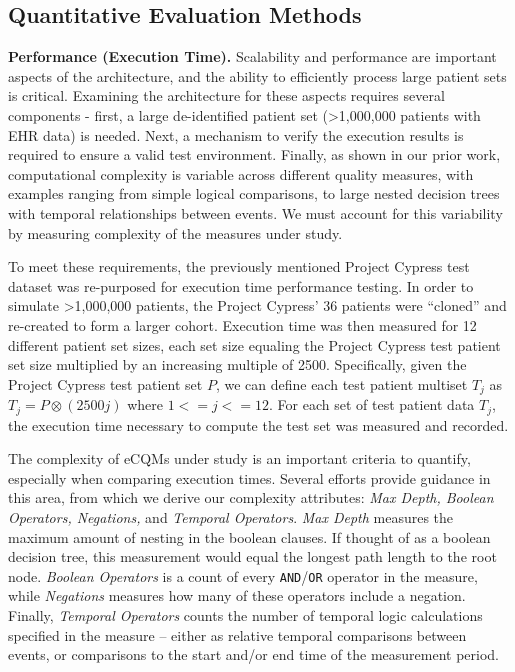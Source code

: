 \documentclass{amia}
\begin{document}
\subsection{Quantitative Evaluation Methods}
\textbf{Performance (Execution Time).}
Scalability and performance are important aspects of the architecture, and the ability to efficiently process large patient sets is critical. Examining the architecture for these aspects requires several components - first, a large de-identified patient set (\textgreater1,000,000 patients with EHR data) is needed. Next, a mechanism to verify the execution results is required to ensure a valid test environment. Finally, as shown in our prior work\cite{thompson2012evaluation}, computational complexity is variable across different quality measures, with examples ranging from simple logical comparisons, to large nested decision trees with temporal relationships between events. We must account for this variability by measuring complexity of the measures under study.

To meet these requirements, the previously mentioned Project Cypress test dataset was re-purposed for execution time performance testing. In order to simulate \textgreater1,000,000 patients, the Project Cypress' 36 patients were ``cloned'' and re-created to form a larger cohort. Execution time was then measured for 12 different patient set sizes, each set size equaling the Project Cypress test patient set size multiplied by an increasing multiple of 2500. Specifically, given the Project Cypress test patient set $P$, we can define each test patient multiset $T_j$ as $T_j = P \otimes (2500j)$ where $1 <= j <= 12$. For each set of test patient data $T_j$, the execution time necessary to compute the test set was measured and recorded.

The complexity of eCQMs under study is an important criteria to quantify, especially when comparing execution times. Several efforts provide guidance in this area\cite{li2012modeling,ross2010analysis}, from which we derive our complexity attributes: \textit{Max Depth,  Boolean Operators, Negations,} and \textit{Temporal Operators}. \textit{Max Depth} measures the maximum amount of nesting in the boolean clauses. If thought of as a boolean decision tree, this measurement would equal the longest path length to the root node. \textit{Boolean Operators} is a count of every \texttt{AND}/\texttt{OR} operator in the measure, while \textit{Negations} measures how many of these operators include a negation. Finally, \textit{Temporal Operators} counts the number of temporal logic calculations specified in the measure -- either as relative temporal comparisons between events, or comparisons to the start and/or end time of the measurement period.
\end{document}
